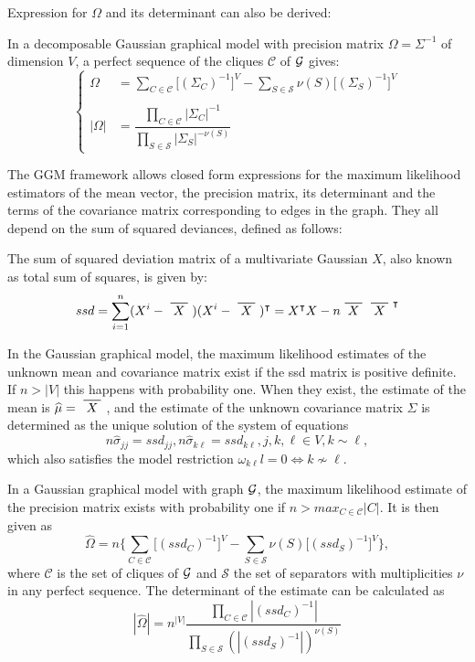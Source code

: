 Expression for $\Omega$ and its determinant can also be derived: 
 \begin{lemma} In a decomposable Gaussian graphical model with precision matrix $\Omega = \Sigma^{-1}$ of dimension $V$, a perfect sequence of the cliques $\mathcal{C}$ of $\mathcal{G}$ gives:
 \begin{equation*}
 \left\{
 \begin{array}{rl}
 \Omega &= \sum_{C\in \mathcal{C}} \big[(\Sigma_C)^{-1}\big]^V - \sum_{S\in \mathcal{S}} \nu(S)  \big[(\Sigma_S)^{-1}\big]^V \\\\
 |\Omega| &=\dfrac{\prod_{C\in \mathcal{C}} |\Sigma_C|^{-1}}{\prod_{S\in \mathcal{S}} |\Sigma_S|^{-\nu(S)}}
 \end{array} \right.
\end{equation*}  
\end{lemma}

The GGM framework allows closed form expressions for the maximum likelihood estimators of the mean vector, the precision matrix, its determinant and the terms of the covariance matrix corresponding to edges in the graph. They all depend on the sum of squared deviances, defined as follows:
\begin{definition}
The sum of squared deviation matrix of a multivariate Gaussian $X$, also known as total sum of squares,  is given by:
$$ssd = \sum_{i=1}^n (X^i - \xbar{X})(X^i - \xbar{X})^\intercal = X^\intercal X - n  \xbar{X} \xbar{X}^\intercal$$
\end{definition}
\begin{theorem}
In the Gaussian graphical model,  the maximum likelihood estimates of the unknown mean and covariance matrix exist if the ssd matrix is positive definite. If $n>|V|$ this happens with probability one. When they exist, the estimate of the mean is $\widehat{\mu} = \xbar{X}$, and the estimate of the unknown covariance matrix $\Sigma$ is determined as the unique solution of the system of equations
$$n\widehat{\sigma}_{jj} = ssd_{jj}, n\widehat{\sigma}_{k\ell} = ssd_{k\ell}, j,k,\ell \in V, k\sim\ell,$$
which also satisfies the model restriction $\omega_{k\ell}l =0 \iff k\nsim \ell $.
\end{theorem}

\begin{theorem}
In a Gaussian graphical model with graph $\mathcal{G}$, the maximum likelihood estimate of the precision matrix exists with probability one if $n>max_{C\in\mathcal{C}}|C|$. It is then given as
$$\widehat{\Omega} = n \bigg\{\sum_{C\in\mathcal{C}} \big[(ssd_C)^{-1}\big]^V-\sum_{S\in\mathcal{S}} \nu(S) \big[(ssd_S)^{-1}\big]^V \bigg\},$$
where $\mathcal{C}$ is the set of cliques of $\mathcal{G}$ and $\mathcal{S}$ the set of separators with multiplicities $\nu$ in any perfect sequence. The determinant of the estimate can be calculated as
$$|\widehat{\Omega}| = n^{|V|} \dfrac{\prod_{C\in\mathcal{C}}|(ssd_C)^{-1}|}{\prod_{S\in\mathcal{S}} (|(ssd_S)^{-1}|)^{\nu(S)}}$$
\end{theorem}
 
